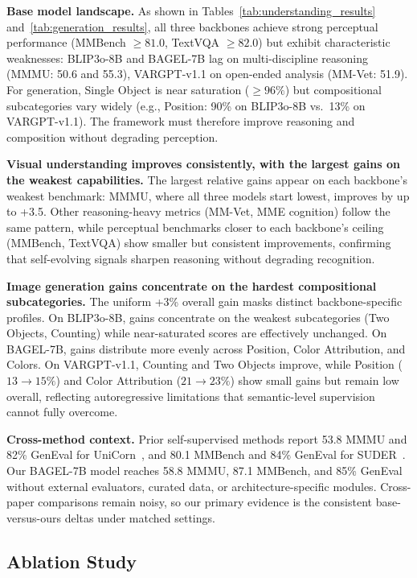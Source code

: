 \noindent\textbf{Base model landscape.} As shown in Tables~\ref{tab:understanding_results} and~\ref{tab:generation_results}, all three backbones achieve strong perceptual performance (MMBench ${\geq}81.0$, TextVQA ${\geq}82.0$) but exhibit characteristic weaknesses: BLIP3o-8B and BAGEL-7B lag on multi-discipline reasoning (MMMU: 50.6 and 55.3), VARGPT-v1.1 on open-ended analysis (MM-Vet: 51.9). For generation, Single Object is near saturation (${\geq}96\%$) but compositional subcategories vary widely (e.g., Position: 90\% on BLIP3o-8B vs.\ 13\% on VARGPT-v1.1). The framework must therefore improve reasoning and composition without degrading perception.

\noindent\textbf{Visual understanding improves consistently, with the largest gains on the weakest capabilities.} The largest relative gains appear on each backbone's weakest benchmark: MMMU, where all three models start lowest, improves by up to +3.5. Other reasoning-heavy metrics (MM-Vet, MME cognition) follow the same pattern, while perceptual benchmarks closer to each backbone's ceiling (MMBench, TextVQA) show smaller but consistent improvements, confirming that self-evolving signals sharpen reasoning without degrading recognition.

\noindent\textbf{Image generation gains concentrate on the hardest compositional subcategories.} The uniform +3\% overall gain masks distinct backbone-specific profiles. On BLIP3o-8B, gains concentrate on the weakest subcategories (Two Objects, Counting) while near-saturated scores are effectively unchanged. On BAGEL-7B, gains distribute more evenly across Position, Color Attribution, and Colors. On VARGPT-v1.1, Counting and Two Objects improve, while Position ($13{\to}15\%$) and Color Attribution ($21{\to}23\%$) show small gains but remain low overall, reflecting autoregressive limitations that semantic-level supervision cannot fully overcome.

\noindent\textbf{Cross-method context.} Prior self-supervised methods report 53.8 MMMU and 82\% GenEval for UniCorn~\cite{han2026unicorn}, and 80.1 MMBench and 84\% GenEval for SUDER~\cite{hong2025dualselfrewards}. Our BAGEL-7B model reaches 58.8 MMMU, 87.1 MMBench, and 85\% GenEval without external evaluators, curated data, or architecture-specific modules. Cross-paper comparisons remain noisy, so our primary evidence is the consistent base-versus-ours deltas under matched settings.

\FloatBarrier

\subsection{Ablation Study}
\label{sec:ablation}

